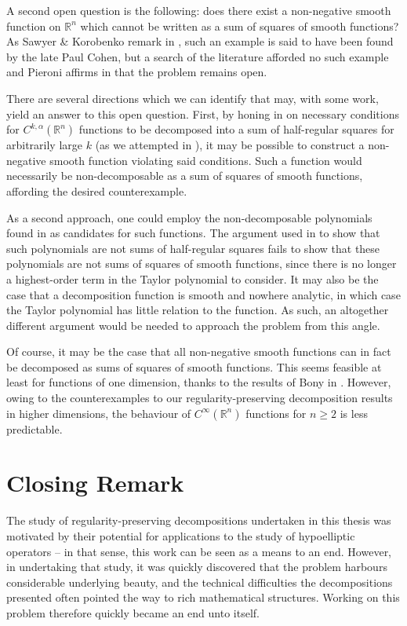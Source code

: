 \documentclass[oneside,hidelinks,indentfirst,10pt]{book}
\begin{document}
A second open question is the following: does there exist a non-negative smooth function on \(\mathbb{R}^n\) which cannot be written as a sum of squares of smooth functions? As Sawyer \& Korobenko remark in \cite{SOS_I}, such an example is said to have been found by the late Paul Cohen, but a search of the literature afforded no such example and Pieroni affirms in \cite[Remark 5.1]{pieroni} that the problem remains open.

There are several directions which we can identify that may, with some work, yield an answer to this open question. First, by honing in on necessary conditions for \(C^{k,\alpha}(\mathbb{R}^n)\) functions to be decomposed into a sum of half-regular squares for arbitrarily large \(k\) (as we attempted in ), it may be possible to construct a non-negative smooth function violating said conditions. Such a function would necessarily be non-decomposable as a sum of squares of smooth functions, affording the desired counterexample.

As a second approach, one could employ the non-decomposable polynomials found in  as candidates for such functions. The argument used in  to show that such polynomials are not sums of half-regular squares fails to show that these polynomials are not sums of squares of smooth functions, since there is no longer a highest-order term in the Taylor polynomial to consider. It may also be the case that a decomposition function is smooth and nowhere analytic, in which case the Taylor polynomial has little relation to the function. As such, an altogether different argument would be needed to approach the problem from this angle.

Of course, it may be the case that all non-negative smooth functions can in fact be decomposed as sums of squares of smooth functions. This seems feasible at least for functions of one dimension, thanks to the results of Bony in \cite{Bony}. However, owing to the counterexamples to our regularity-preserving decomposition results in higher dimensions, the behaviour of \(C^{\infty}(\mathbb{R}^n)\) functions for \(n\geq 2\) is less predictable. 


\section{Closing Remark}


The study of regularity-preserving decompositions undertaken in this thesis was motivated by their potential for applications to the study of hypoelliptic operators -- in that sense, this work can be seen as a means to an end. However, in undertaking that study, it was quickly discovered that the problem harbours considerable underlying beauty, and the technical difficulties  the decompositions presented often pointed the way to rich mathematical structures. Working on this problem therefore quickly became an end unto itself.
\end{document}
